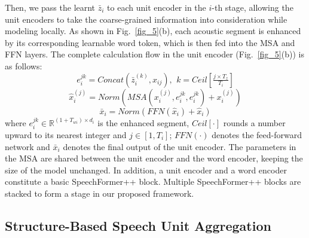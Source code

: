\documentclass[lettersize,journal]{IEEEtran}
\begin{document}
Then, we pass the learnt $\bar{z}_i$ to each unit encoder in the $i$-th stage, allowing the unit encoders to take the coarse-grained information into consideration while modeling locally. As shown in Fig.~\ref{fig_5}(b), each acoustic segment is enhanced by its corresponding learnable word token, which is then fed into the MSA and FFN layers. The complete calculation flow in the unit encoder (Fig.~\ref{fig_5}(b)) is  as follows:
\begin{equation}
e_i^{jk} = Concat(\bar{z}_i^{(k)}, x_{ij}),\, \  k=Ceil\left[\tfrac{j\times T_z}{T_i}\right]
\label{eq12}
\end{equation}
\begin{equation}
\hat{x}_i^{(j)} = Norm(MSA(x_i^{(j)}, e_i^{jk}, e_i^{jk}) + x_i^{(j)})
\label{eq13}
\end{equation}
\begin{equation}
\bar{x}_i = Norm(FFN(\hat{x}_i)+\hat{x}_i)
\label{eq14}
\end{equation}
where $e_i^{jk} \in \mathbb{R}^{(1+T_{wi}) \times d_i}$ is the enhanced segment, $Ceil[\cdot]$ rounds a number upward to its nearest integer and $j \in [1, T_i]$; $FFN(\cdot)$ denotes the feed-forward network and $\bar{x}_i$ denotes the final output of the unit encoder. 
The parameters in the MSA are shared between the unit encoder and the word encoder, keeping the size of the model unchanged.
In addition, a unit encoder and a word encoder constitute a basic SpeechFormer++ block. Multiple SpeechFormer++ blocks are stacked to form a stage in our proposed framework.

\subsection{Structure-Based Speech Unit Aggregation}
\label{MB}
\end{document}
